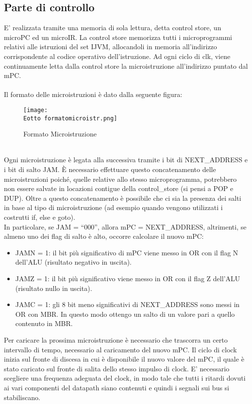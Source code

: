 \documentclass[12pt]{article}
\def \Eotto {Allegati/Esercizio8/}
\begin{document}
\subsection{Parte di controllo}
E’ realizzata tramite una memoria di sola lettura, detta control store, un microPC ed un microIR. La control store memorizza tutti i microprogrammi relativi alle istruzioni del set IJVM, allocandoli in memoria all’indirizzo corrispondente al codice operativo dell’istruzione.
Ad ogni ciclo di clk, viene continuamente letta dalla control store la microistruzione all’indirizzo puntato dal mPC.
\\\\Il formato delle microistruzioni è dato dalla seguente figura:
\begin{figure}[ht!]
    \centering
    \texttt{[image: \\Eotto formatomicroistr.png]}
    \caption{Formato Microistruzione}
\end{figure}
\\Ogni microistruzione è legata alla successiva tramite i bit di NEXT\_ADDRESS e i bit di salto JAM. È necessario effettuare questo concatenamento delle microistruzioni poiché, quelle relative allo stesso microprogramma, potrebbero non essere salvate in locazioni contigue della control\_store (si pensi a POP e DUP). Oltre a questo concatenamento è possibile che ci sia la presenza dei salti in base al tipo di microistruzione (ad esempio quando vengono utilizzati i costrutti if, else e goto).
\\In particolare, se JAM = “000”, allora mPC = NEXT\_ADDRESS, altrimenti, se almeno uno dei flag di salto è alto, occorre calcolare il nuovo mPC:
\begin{itemize}
    \item JAMN = 1: il bit più significativo di mPC viene messo in OR  con il flag N dell’ALU (risultato negativo in uscita).
    \item JAMZ = 1: il bit più significativo viene messo in OR con il flag Z dell’ALU (risultato nullo in uscita).
    \item JAMC = 1: gli 8 bit meno significativi di NEXT\_ADDRESS sono messi in OR con MBR. In questo modo ottengo un salto di un valore pari a quello contenuto in MBR.
\end{itemize}
Per caricare la prossima microistruzione è necessario che trascorra un certo intervallo di tempo, necessario al caricamento del nuovo mPC. Il ciclo di clock inizia sul fronte di discesa in cui è disponibile il nuovo valore del mPC, il quale è stato caricato sul fronte di salita dello stesso impulso di clock. E’ necessario scegliere una frequenza adeguata del clock, in modo tale che tutti i ritardi dovuti ai vari componenti del datapath siano contenuti e quindi i segnali sui bus si stabiliscano.
\end{document}
